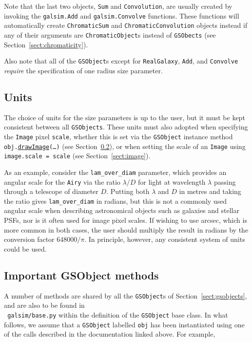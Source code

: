 \documentclass[preprint,11pt]{../../devel/modules/aastex}
\begin{document}
Note that the last two objects, \texttt{Sum} and \texttt{Convolution}, are usually created by
invoking the \texttt{galsim.Add} and \texttt{galsim.Convolve} functions.  These functions will
automatically create \texttt{ChromaticSum} and \texttt{ChromaticConvolution} objects instead if
any of their arguments are \texttt{ChromaticObject}s instead of
\texttt{GSObects} (see Section~\ref{sect:chromaticity}).

Also note that all of the \texttt{GSObject}s except for \texttt{RealGalaxy}, \texttt{Add}, and
\texttt{Convolve} {\em require} the specification of one radius size
parameter.

\subsection{Units}
The choice of units for the size parameters is up to the user,
but it must be kept consistent between all \texttt{GSObjects}.  These
units must also adopted when specifying the \texttt{Image} pixel
\texttt{scale}, whether this is set via the \texttt{GSObject}
instance method \texttt{obj.}\href{http://galsim-developers.github.com/GalSim/classgalsim_1_1base_1_1_g_s_object.html#ae0b346a8b438dedbc7f60a52220869d8}{\texttt{drawImage}}\texttt{(\dots)}
(see Section~\ref{sect:gsobjectmethods}),
or when setting the scale of an \texttt{Image}
using \texttt{image.scale = scale} (see Section~\ref{sect:image}).

As an example, consider the
\texttt{lam\_over\_diam} parameter, which provides an angular scale for
the \texttt{Airy} via
the ratio $\lambda / D$ for light at wavelength $\lambda$ passing
through a telescope of diameter $D$. Putting both $\lambda$ and
$D$ in metres and taking the ratio gives \texttt{lam\_over\_diam} in
radians, but this is not a commonly used angular scale when describing
astronomical objects such as galaxies and stellar PSFs, nor is
it often used for image pixel scales.  If wishing to use arcsec, which
is more common in both cases, the user should multiply the result in
radians by the conversion factor
$648000 / \pi$.  In principle, however, any consistent
system of units could be used.


\subsection{Important GSObject methods}\label{sect:gsobjectmethods}
A number of methods are shared by all the \texttt{GSObject}s of
Section~\ref{sect:gsobjects}, and are also to be found in \\ {\tt
 galsim/base.py} within the definition of the
\texttt{GSObject} base class.  In what follows, we assume that a
\texttt{GSObject} labelled \texttt{obj} has been instantiated using
one of the calls described in the documentation linked above.  For
example,
\end{document}

